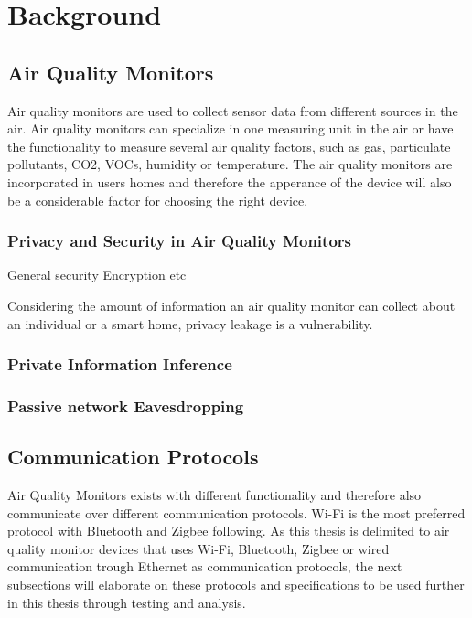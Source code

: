 \chapter*{Background}

\section*{Air Quality Monitors}
Air quality monitors are used to collect sensor data from different sources in the air. \cite{GeneralAirQualityMonitor} Air quality monitors can specialize in one measuring unit in the air or have the functionality to measure several air quality factors, such as gas, particulate pollutants, CO2, VOCs, humidity or temperature. The air quality monitors are incorporated in users homes and therefore the apperance of the device will also be a considerable factor for choosing the right device. \cite{IAQMonitorCommunicationReview} 
\\


\subsection*{Privacy and Security in Air Quality Monitors}
General security 
Encryption etc

Considering the amount of information an air quality monitor can collect about an individual or a smart home, privacy leakage is a vulnerability. \cite{SecPrivSmartCity} 


\subsection*{Private Information Inference}


\subsection*{Passive network Eavesdropping}

\section*{Communication Protocols}
Air Quality Monitors exists with different functionality and therefore also communicate over different communication protocols. Wi-Fi is the most preferred protocol with Bluetooth and Zigbee following. \cite{saini2020indoor} As this thesis is delimited to air quality monitor devices that uses Wi-Fi, Bluetooth, Zigbee or wired communication trough Ethernet as communication protocols, the next subsections will elaborate on these protocols and specifications to be used further in this thesis through testing and analysis. 

